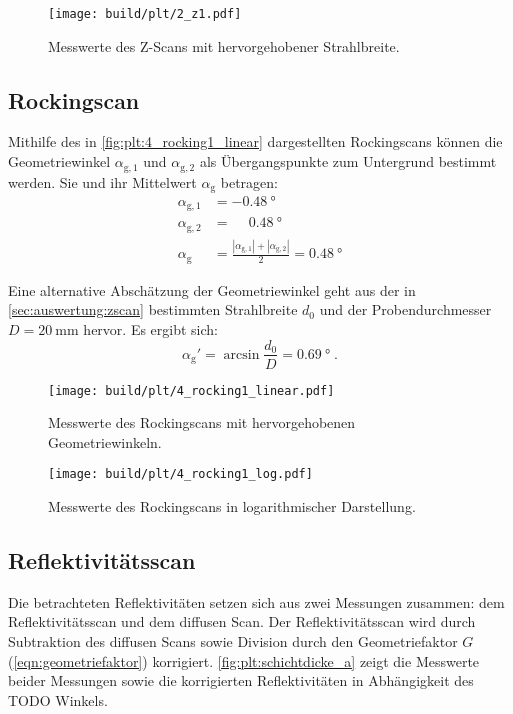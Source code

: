 \begin{figure}
    \centering
    \texttt{[image: build/plt/2\_z1.pdf]}
    \caption{Messwerte des Z-Scans mit hervorgehobener Strahlbreite.}
    \label{fig:plt:2_z1}
\end{figure}


\FloatBarrier
\subsection{Rockingscan} \label{sec:auswertung:rockingscan}
Mithilfe des in \autoref{fig:plt:4_rocking1_linear}
dargestellten Rockingscans
können die Geometriewinkel $\alpha_{\text{g}, 1}$ und $\alpha_{\text{g}, 2}$
als Übergangspunkte zum Untergrund bestimmt werden.
Sie und ihr Mittelwert $\alpha_\text{g}$ betragen:
\begin{align*}
    \alpha_{\text{g}, 1} &= \SI{-0.48}{\degree} \\
    \alpha_{\text{g}, 2} &= \phantom{-} \SI{0.48}{\degree} \\
    \alpha_\text{g} &= \frac{|\alpha_{\text{g}, 1}| + |\alpha_{\text{g}, 2}|}{2}
        = \SI{0.48}{\degree}
\end{align*}

Eine alternative Abschätzung der Geometriewinkel
geht aus der in \autoref{sec:auswertung:zscan} bestimmten Strahlbreite $d_0$ und der Probendurchmesser $D = \SI{20}{\milli\meter}$ hervor.
Es ergibt sich:
\[
    \alpha_\text{g}' = \arcsin{\frac{d_0}{D}}
    = \SI{0.69}{\degree} \; .
\]

\begin{figure}
    \centering
    \texttt{[image: build/plt/4\_rocking1\_linear.pdf]}
    \caption{Messwerte des Rockingscans mit hervorgehobenen Geometriewinkeln.}
    \label{fig:plt:4_rocking1_linear}
\end{figure}

\begin{figure}
    \centering
    \texttt{[image: build/plt/4\_rocking1\_log.pdf]}
    \caption{Messwerte des Rockingscans in logarithmischer Darstellung.}
    \label{fig:plt:4_rocking1_log}
\end{figure}


\FloatBarrier
\subsection{Reflektivitätsscan} \label{sec:auswertung:schichtdicke}
Die betrachteten Reflektivitäten setzen sich aus zwei Messungen zusammen:
dem Reflektivitätsscan und dem diffusen Scan.
Der Reflektivitätsscan wird durch
    Subtraktion des diffusen Scans sowie
    Division durch den Geometriefaktor $G$ (\autoref{eqn:geometriefaktor})
korrigiert.
\autoref{fig:plt:schichtdicke_a} zeigt die Messwerte beider Messungen sowie die korrigierten Reflektivitäten
in Abhängigkeit des TODO Winkels.

